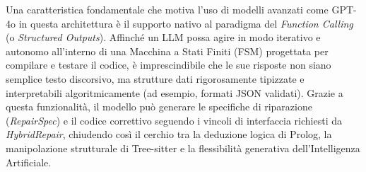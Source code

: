 Una caratteristica fondamentale che motiva l'uso di modelli avanzati come GPT-4o in questa architettura è il supporto 
nativo al paradigma del \textit{Function Calling} (o \textit{Structured Outputs}). Affinché un LLM possa agire in modo 
iterativo e autonomo all'interno di una Macchina a Stati Finiti (FSM) progettata per compilare e testare il codice, è 
imprescindibile che le sue risposte non siano semplice testo discorsivo, ma strutture dati rigorosamente tipizzate e 
interpretabili algoritmicamente (ad esempio, formati JSON validati). Grazie a questa funzionalità, il modello può generare le 
specifiche di riparazione (\textit{RepairSpec}) e il codice correttivo seguendo i vincoli di interfaccia 
richiesti da \textit{HybridRepair}, chiudendo così il cerchio tra la deduzione logica di Prolog, la manipolazione strutturale 
di Tree-sitter e la flessibilità generativa dell'Intelligenza Artificiale.